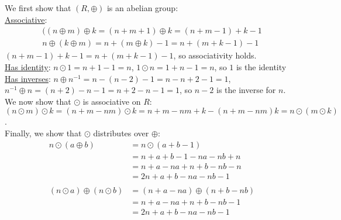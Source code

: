 \documentclass{article}
\begin{document}
\section{} %
We first show that $(R,\oplus)$ is an abelian group:\\
\underline{Associative}:
\begin{align*}
	((n\oplus m)\oplus k=(n+m+1)\oplus k=(n+m-1)+k-1\\
	n\oplus(k\oplus m)=n+(m\oplus k)-1=n+(m+k-1)-1
\end{align*}
$(n+m-1)+k-1=n+(m+k-1)-1$, so associativity holds.\\
\underline{Has identity}: $n\odot1=n+1-1=n$, $1\odot n=1+n-1=n$, so $1$ is the
identity\\
\underline{Has inverses}: $n\oplus n^{-1}=n-(n-2)-1=n-n+2-1=1$,
$n^{-1}\oplus n=(n+2)-n-1=n+2-n-1=1$, so $n-2$ is the inverse for $n$.
We now show that $\odot$ is associative on $R$:\\
$(n\odot m)\odot k=(n+m-nm)\odot k=n+m-nm+k-(n+m-nm)k=n\odot(m\odot k)$.\\
Finally, we show that $\odot$ distributes over $\oplus$:\\
\begin{align*}
	n\odot(a\oplus b)&=n\odot(a+b-1)\\
	&=n+a+b-1-na-nb+n\\
	&=n+a-na+n+b-nb-n\\
	&=2n+a+b-na-nb-1\\\\
	(n\odot a)\oplus(n\odot b)&=(n+a-na)\oplus(n+b-nb)\\
	&=n+a-na+n+b-nb-1\\
	&=2n+a+b-na-nb-1
\end{align*}
\end{document}
